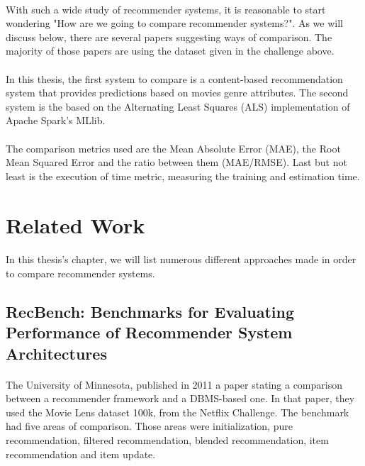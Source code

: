 \paragraph{} With such a wide study of recommender systems, it is reasonable to start wondering "How are we going to compare recommender systems?". As we will discuss below, there are several papers suggesting ways of comparison. The majority of those papers are using the dataset given in the challenge above.

\paragraph{} In this thesis, the first system to compare is a content-based recommendation system that provides predictions based on movies genre attributes. The second system is the based on the Alternating Least Squares (ALS) implementation of Apache Spark's MLlib.

\paragraph{} The comparison metrics used are the Mean Absolute Error (MAE), the Root Mean Squared Error and the ratio between them (MAE/RMSE). Last but not least is the execution of time metric, measuring the training and estimation time.

\section{Related Work}
\paragraph{} In this thesis's chapter, we will list numerous different approaches made in order to compare recommender systems.

\subsection{RecBench: Benchmarks for Evaluating Performance of Recommender System Architectures \cite{levandoski2011recbench}}
\paragraph{} The University of Minnesota, published in 2011 a paper stating a comparison between a recommender framework and a DBMS-based one. In that paper, they used the Movie Lens dataset 100k, from the Netflix Challenge. The benchmark had five areas of comparison. Those areas were initialization, pure recommendation, filtered recommendation, blended recommendation, item recommendation and item update.

